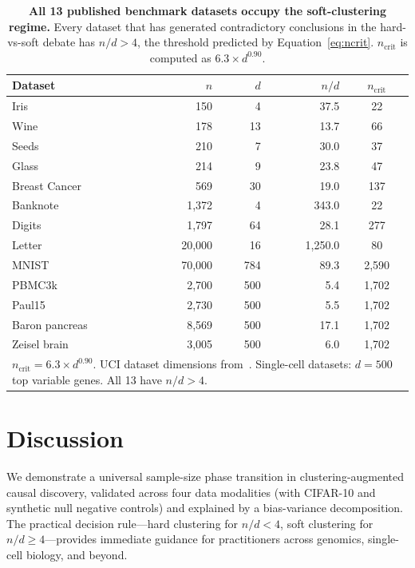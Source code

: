 \documentclass[12pt,a4paper]{article}
\begin{document}
\begin{table}[htbp]
\centering
\caption{\textbf{All 13 published benchmark datasets occupy the soft-clustering regime.}
Every dataset that has generated contradictory conclusions in the hard-vs-soft debate
has $n/d > 4$, the threshold predicted by Equation~\ref{eq:ncrit}.
$n_{\text{crit}}$ is computed as $6.3 \times d^{0.90}$.}
\label{tab:benchmarks}
\small
\begin{tabular}{lrrrc}
\toprule
Dataset & $n$ & $d$ & $n/d$ & $n_{\text{crit}}$ \\
\midrule
Iris~\cite{fisher1936iris} & 150 & 4 & 37.5 & 22 \\
Wine & 178 & 13 & 13.7 & 66 \\
Seeds & 210 & 7 & 30.0 & 37 \\
Glass & 214 & 9 & 23.8 & 47 \\
Breast Cancer & 569 & 30 & 19.0 & 137 \\
Banknote & 1,372 & 4 & 343.0 & 22 \\
Digits & 1,797 & 64 & 28.1 & 277 \\
Letter & 20,000 & 16 & 1,250.0 & 80 \\
MNIST~\cite{lecun1998mnist} & 70,000 & 784 & 89.3 & 2,590 \\
PBMC3k~\cite{zheng2017massively} & 2,700 & 500 & 5.4 & 1,702 \\
Paul15 & 2,730 & 500 & 5.5 & 1,702 \\
Baron pancreas & 8,569 & 500 & 17.1 & 1,702 \\
Zeisel brain & 3,005 & 500 & 6.0 & 1,702 \\
\midrule
\multicolumn{5}{l}{\footnotesize $n_{\text{crit}} = 6.3 \times d^{0.90}$. UCI dataset dimensions from~\cite{dua2017uci}. Single-cell datasets: $d=500$ top variable genes. All 13 have $n/d > 4$.} \\
\end{tabular}
\end{table}

\section{Discussion}

We demonstrate a universal sample-size phase transition in clustering-augmented causal discovery, validated across four data modalities (with CIFAR-10 and synthetic null negative controls) and explained by a bias-variance decomposition. The practical decision rule---hard clustering for $n/d < 4$, soft clustering for $n/d \ge 4$---provides immediate guidance for practitioners across genomics, single-cell biology, and beyond.
\end{document}
